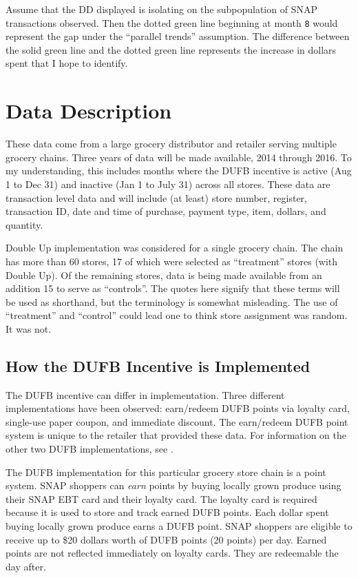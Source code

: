\documentclass[12pt,letterpaperpaper,]{book}
\begin{document}
Assume that the DD displayed is isolating on the subpopulation of SNAP
transactions observed. Then the dotted green line beginning at month
\texttt{8} would represent the gap under the ``parallel trends''
assumption. The difference between the solid green line and the dotted
green line represents the increase in dollars spent that I hope to
identify.

\newpage

\hypertarget{data-1}{\section*{Data Description}\label{data-1}}

These data come from a large grocery distributor and retailer serving
multiple grocery chains. Three years of data will be made available,
2014 through 2016. To my understanding, this includes months where the
DUFB incentive is active (Aug 1 to Dec 31) and inactive (Jan 1 to July
31) across all stores. These data are transaction level data and will
include (at least) store number, register, transaction ID, date and time
of purchase, payment type, item, dollars, and quantity.

Double Up implementation was considered for a single grocery chain. The
chain has more than 60 stores, 17 of which were selected as
``treatment'' stores (with Double Up). Of the remaining stores, data is
being made available from an addition 15 to serve as ``controls''. The
quotes here signify that these terms will be used as shorthand, but the
terminology is somewhat misleading. The use of ``treatment'' and
``control'' could lead one to think store assignment was random. It was
not.

\subsection*{How the DUFB Incentive is
Implemented}\label{how-the-dufb-incentive-is-implemented}

The DUFB incentive can differ in implementation. Three different
implementations have been observed: earn/redeem DUFB points via loyalty
card, single-use paper coupon, and immediate discount. The earn/redeem
DUFB point system is unique to the retailer that provided these data.
For information on the other two DUFB implementations, see
\citep{margaret_schnuck_doubling_2016}.

The DUFB implementation for this particular grocery store chain is a
point system. SNAP shoppers can \emph{earn} points by buying locally
grown produce using their SNAP EBT card and their loyalty card. The
loyalty card is required because it is used to store and track earned
DUFB points. Each dollar spent buying locally grown produce earns a DUFB
point. SNAP shoppers are eligible to receive up to \$20 dollars worth of
DUFB points (20 points) per day. Earned points are not reflected
immediately on loyalty cards. They are redeemable the day after.
\end{document}
